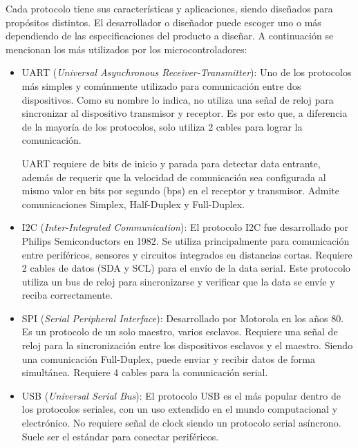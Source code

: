 Cada protocolo tiene sus características y aplicaciones, siendo diseñados para propósitos distintos. El desarrollador o diseñador puede escoger uno o más dependiendo de las especificaciones del producto a diseñar. A continuación se mencionan los más utilizados por los microcontroladores:

\begin{itemize}
    \item UART (\textit{Universal Asynchronous Receiver-Transmitter}): Uno de los protocolos más simples y comúnmente utilizado para comunicación entre dos dispositivos. Como su nombre lo indica, no utiliza una señal de reloj para sincronizar al dispositivo transmisor y receptor. Es por esto que, a diferencia de la mayoría de los protocolos, solo utiliza 2 cables para lograr la comunicación.
    
    UART requiere de bits de inicio y parada para detectar data entrante, además de requerir que la velocidad de comunicación sea configurada al mismo valor en bits por segundo (bps) en el receptor y transmisor. Admite comunicaciones Simplex, Half-Duplex y Full-Duplex.
 
    \item I2C (\textit{Inter-Integrated Communication}):  El protocolo I2C fue desarrollado por Philips Semiconductors en 1982. Se utiliza principalmente para comunicación entre periféricos, sensores y circuitos integrados en distancias cortas. Requiere 2 cables de datos (SDA y SCL) para el envío de la data serial. Este protocolo utiliza un bus de reloj para sincronizarse y verificar que la data se envíe y reciba correctamente.
    
    \item SPI (\textit{Serial Peripheral Interface}): Desarrollado por Motorola en los años 80. Es un protocolo de un solo maestro, varios esclavos. Requiere una señal de reloj para la sincronización entre los dispositivos esclavos y el maestro. Siendo una comunicación Full-Duplex, puede enviar y recibir datos de forma simultánea. Requiere 4 cables para la comunicación serial.

    \item USB (\textit{Universal Serial Bus}): El protocolo USB es el más popular dentro de los protocolos seriales, con un uso extendido en el mundo computacional y electrónico. No requiere señal de clock siendo un protocolo serial asíncrono. Suele ser el estándar para conectar periféricos.
    
\end{itemize}

